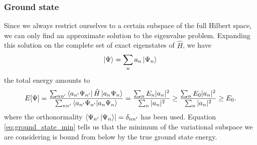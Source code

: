 \subsubsection{Ground state}
Since we always restrict ourselves to a certain subspace of the full Hilbert space, we can only find an approximate solution to the eigenvalue problem. Expanding this solution on the complete set of exact eigenstates of $\hat H$, we have
\begin{equation}
    \label{eq:expansion_gs}
    \ket\Psi = \sum_n a_n \ket{\Psi_n}    
\end{equation}
the total energy amounts to 
\begin{equation}
    \label{eq:ground_state_min}
    E[\Psi] = \frac{\sum_{nn'}\bra {a_{n'}\Psi_{n'}}\hat H \ket{a_n \Psi_n}}{\sum_{nn'}\bra{a_{n'}\Psi_{n'}}\ket{a_n\Psi_{n}}} = \frac{\sum_{n}E_n|a_n|^2}{\sum_n|a_n|^2}\ge \frac{\sum_{n}E_0|a_n|^2}{\sum_n|a_n|^2}\ge E_0.
\end{equation}
where the orthonormality $\bra{\Psi_{n'}\ket{\Psi_n}}=\delta_{nn'}$ has been used. Equation \ref{eq:ground_state_min} tells us that the minimum of the variational subspace we are considering is bound from below by the true ground state energy.
